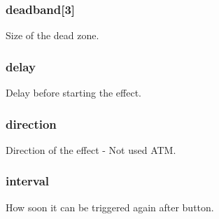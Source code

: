 \subsubsection[{\texorpdfstring{deadband}{deadband}}]{ deadband\mbox{[}3\mbox{]}}\hypertarget{struct_s_d_l___haptic_condition_a255b46ed67f0237c08b4d2f4cd62665d}{}\label{struct_s_d_l___haptic_condition_a255b46ed67f0237c08b4d2f4cd62665d}
Size of the dead zone. 
\subsubsection[{\texorpdfstring{delay}{delay}}]{ delay}\hypertarget{struct_s_d_l___haptic_condition_a069408e960d0f2ba482421f2dd2ec003}{}\label{struct_s_d_l___haptic_condition_a069408e960d0f2ba482421f2dd2ec003}
Delay before starting the effect. 
\subsubsection[{\texorpdfstring{direction}{direction}}]{ direction}\hypertarget{struct_s_d_l___haptic_condition_a9fe6fc39233e26d6c0705ae77e43d96c}{}\label{struct_s_d_l___haptic_condition_a9fe6fc39233e26d6c0705ae77e43d96c}
Direction of the effect -\/ Not used A\+TM. 
\subsubsection[{\texorpdfstring{interval}{interval}}]{ interval}\hypertarget{struct_s_d_l___haptic_condition_a263a60513b1bdb1e91b28bd2e128e9d4}{}\label{struct_s_d_l___haptic_condition_a263a60513b1bdb1e91b28bd2e128e9d4}
How soon it can be triggered again after button. 
